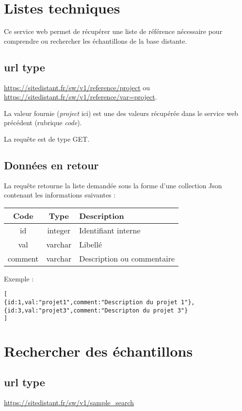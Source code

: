 \section{Listes techniques}
\label{listes}

Ce service web permet de récupérer une liste de référence nécessaire pour comprendre ou rechercher les échantillons de la base distante.

\subsection{url type}
\url{https://sitedistant.fr/sw/v1/reference/project} ou 
\url{https://sitedistant.fr/sw/v1/reference/var=project}.

La valeur fournie (\textit{project} ici) est une des valeurs récupérée dans le service web précédent (rubrique \textit{code}).

La requête est de type GET. 


\subsection{Données en retour}
La requête retourne la liste demandée sous la forme d'une collection Json contenant les informations suivantes :

\begin{longtable}{|c|c|>{\raggedright\arraybackslash}p{10cm}|}
\hline 
Code & Type & Description \\ 
\hline
id & integer & Identifiant interne\\
\hline
val & varchar & Libellé\\
\hline
comment & varchar & Description ou commentaire\\
\hline \endhead
\end{longtable}

Exemple :
\begin{lstlisting}
[
{id:1,val:"projet1",comment:"Description du projet 1"},
{id:3,val:"projet3",comment:"Descripton du projet 3"}
]
\end{lstlisting}


\section{Rechercher des échantillons}
\label{sampleSearch}
\subsection{url type}
\url{https://sitedistant.fr/sw/v1/sample_search}

